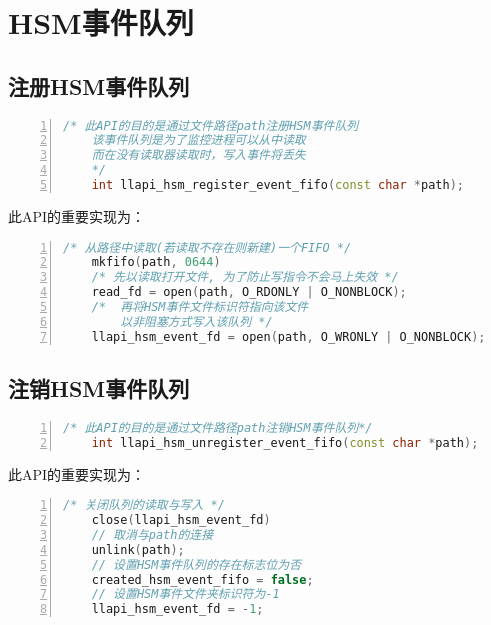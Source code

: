 \section{HSM事件队列}

\subsection{注册HSM事件队列}

\begin{lstlisting}[language={c++},numbers=left]
    /* 此API的目的是通过文件路径path注册HSM事件队列
    该事件队列是为了监控进程可以从中读取
    而在没有读取器读取时，写入事件将丢失
    */
    int llapi_hsm_register_event_fifo(const char *path);
\end{lstlisting}
此API的重要实现为：
\begin{lstlisting}[language={c++},numbers=left]
    /* 从路径中读取(若读取不存在则新建)一个FIFO */
    mkfifo(path, 0644)
    /* 先以读取打开文件, 为了防止写指令不会马上失效 */
    read_fd = open(path, O_RDONLY | O_NONBLOCK);
    /*  再将HSM事件文件标识符指向该文件
        以非阻塞方式写入该队列 */
    llapi_hsm_event_fd = open(path, O_WRONLY | O_NONBLOCK);
\end{lstlisting}

\subsection{注销HSM事件队列}
\begin{lstlisting}[language={c++},numbers=left]
    /* 此API的目的是通过文件路径path注销HSM事件队列*/
    int llapi_hsm_unregister_event_fifo(const char *path);
\end{lstlisting}
此API的重要实现为：
\begin{lstlisting}[language={c++},numbers=left]
    /* 关闭队列的读取与写入 */
    close(llapi_hsm_event_fd)
    // 取消与path的连接
    unlink(path);
    // 设置HSM事件队列的存在标志位为否
    created_hsm_event_fifo = false;
    // 设置HSM事件文件夹标识符为-1
    llapi_hsm_event_fd = -1;
\end{lstlisting}

